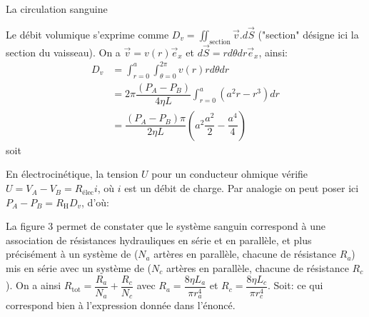 \begin{exo}[PC][1][devoir]{La circulation sanguine}
\begin{quest}
  {
  Le débit volumique s'exprime comme $D_{v}=\iint_{\mathrm{section}}\overrightarrow{v}.d\overrightarrow{S}$
  ("section" désigne ici la section du vaisseau). On a $\overrightarrow{v}=v(r)\overrightarrow{e}_{x}$ et $d\overrightarrow{S}=rd\theta dr \overrightarrow{e}_{x}$, ainsi:
  \begin{align*}
  D_{v}&=\int_{r=0}^{a} \int_{\theta=0}^{2\pi}v(r) rd\theta dr \\
  &=2\pi\dfrac{\left( P_{A}-P_{B} \right)}{4\eta L} \int_{r=0}^{a} \left( a^{2}r -r^{3} \right) dr\\
  &=\dfrac{\left( P_{A}-P_{B} \right)\pi}{2\eta L}  \left( a^{2}\dfrac{a^{2}}{2} - \dfrac{a^{4}}{4} \right)
  \end{align*}
  soit

  En électrocinétique, la tension $U$ pour un conducteur ohmique vérifie $U=V_{A}-V_{B}=R_{\mathrm{élec}}i$, où $i$ est un débit de charge. Par analogie on peut poser ici $P_{A}-P_{B}=R_{\mathrm{H}}D_{v}$, d'où:
  }
  {
  La figure 3 permet de constater que le système sanguin correspond à une association de résistances hydrauliques en série et en parallèle, et plus précisément à un système de ($N_{a}$ artères en parallèle, chacune de résistance $R_{a}$) mis en série avec un système de ($N_{c}$ artères en parallèle, chacune de résistance $R_{c}$). On a ainsi $R_{\mathrm{tot}}=\dfrac{R_{a}}{N_{a}}+\dfrac{R_{c}}{N_{c}}$ avec $R_{a}=\dfrac{8\eta L_{a}}{\pi r_{a}^{4}}$ et $R_{c}=\dfrac{8\eta L_{c}}{\pi r_{c}^{4}}$. Soit:
  ce qui correspond bien à l'expression donnée dans l'énoncé.

  }
\end{quest}


\end{exo}
